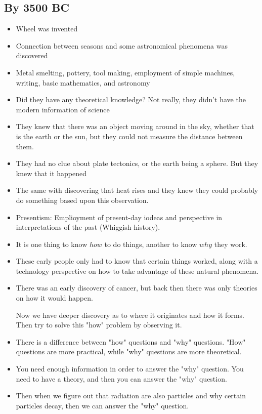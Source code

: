 \documentclass{article}
\begin{document}
\subsection{By 3500 BC}
\begin{itemize}
  \item Wheel was invented
  \item Connection between seasons and some astronomical phenomena
    was discovered
  \item Metal smelting, pottery, tool making, employment of simple machines, writing, basic
    mathematics, and astronomy
  \item Did they have any theoretical knowledge?
    Not really, they didn't have the modern information of science
  \item They knew that there was an object moving around in the sky,
    whether that is the earth or the sun, but they could not measure the
    distance between them.
  \item They had no clue about plate tectonics, or the earth being a sphere.
    But they knew that it happened
  \item The same with discovering that heat rises and they knew they could
    probably do something based upon this observation.
  \item Presentism: Emplioyment of present-day iodeas
    and perspective in interpretations of the past (Whiggish history).
  \item It is one thing to know $how$ to do things, another to know $why$ they work.
  \item These early people only had to know that certain things worked,
    along with a technology perspective on how to take advantage of these natural phenomena.
  \item There was an early discovery of cancer, but back then there was only
    theories on how it would happen.

    Now we have deeper discovery as to where it originates and how it forms.
    Then try to solve this "how" problem by observing it.
  \item There is a difference between "how" questions and "why" questions.
    "How" questions are more practical, while "why" questions are more theoretical.
  \item You need enough information in order to answer the "why" question.
    You need to have a theory, and then you can answer the "why" question.
  \item Then when we figure out that radiation are also particles and
    why certain particles decay, then we can answer the "why" question.
\end{itemize}
\end{document}
